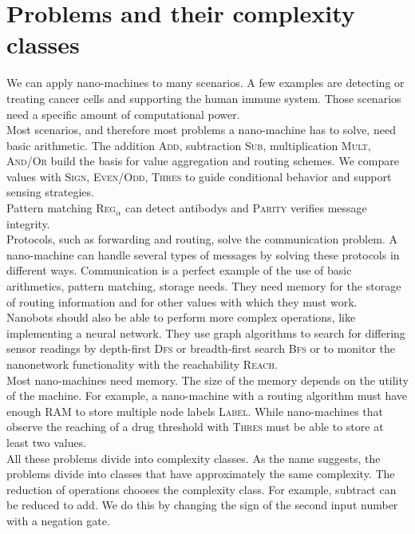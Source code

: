 \documentclass[10pt,sigconf]{acmart}
\begin{document}
\section{Problems and their complexity classes}
We can apply nano-machines to many scenarios.
A few examples are detecting or treating cancer cells and supporting the human immune system.
Those scenarios need a specific amount of computational power.\\
Most scenarios, and therefore most problems a nano-machine has to solve, need basic arithmetic.
The addition \textsc{Add}, subtraction \textsc{Sub}, multiplication \textsc{Mult}, \textsc{And}/\textsc{Or} build the basis for value aggregation and routing schemes.
We compare values with \textsc{Sign}, \textsc{Even}/\textsc{Odd}, \textsc{Thres} to guide conditional behavior and support sensing strategies.\\
Pattern matching \textsc{Reg$_{\alpha}$} can detect antibodys and \textsc{Parity} verifies message integrity.\\
Protocols, such as forwarding and routing, solve the communication problem. 
A nano-machine can handle several types of messages by solving these protocols in different ways.
Communication is a perfect example of the use of basic arithmetics, pattern matching, storage needs.
They need memory for the storage of routing information and for other values with which they must work.\\
Nanobots should also be able to perform more complex operations, like implementing a neural network.
They use graph algorithms to search for differing sensor readings by depth-first \textsc{Dfs} or breadth-first search \textsc{Bfs} or to monitor the nanonetwork functionality with the reachability \textsc{Reach}.\\
Most nano-machines need memory. The size of the memory depends on the utility of the machine.
For example, a nano-machine with a routing algorithm must have enough RAM to store multiple node labels \textsc{Label}.
While nano-machines that observe the reaching of a drug threshold with \textsc{Thres} must be able to store at least two values.\\
All these problems divide into complexity classes.
As the name suggests, the problems divide into classes that have approximately the same complexity.
The reduction of operations chooses the complexity class. For example, subtract can be reduced to add. 
We do this by changing the sign of the second input number with a negation gate. \\
\end{document}
